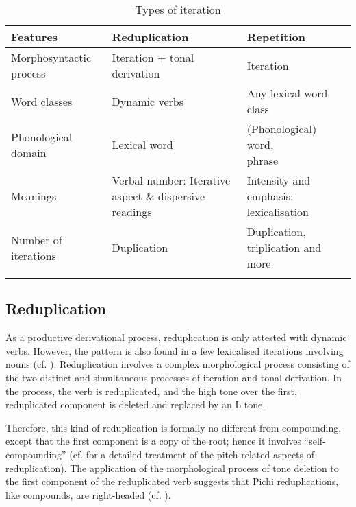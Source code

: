 \begin{table}
\caption{Types of iteration}
\label{tab:key:4.6}
\small
\begin{tabularx}{\textwidth}{lQp{3.5cm}}
\lsptoprule

Features & Reduplication & Repetition\\
\midrule
Morphosyntactic process & Iteration + tonal derivation & Iteration\\
\tablevspace
Word classes & Dynamic verbs & Any lexical word class\\
\tablevspace
Phonological domain & Lexical word & {(Phonological) word,\newline phrase}\\
\tablevspace
Meanings & Verbal number: Iterative aspect \& dispersive readings & Intensity and emphasis; lexicalisation\\
\tablevspace
Number of iterations & Duplication & Duplication, triplication and more\\
\lspbottomrule
\end{tabularx}
\end{table}
\subsection{Reduplication}\label{sec:4.5.1}

As a productive derivational process, reduplication is only attested with dynamic verbs. However, the pattern is also found in a few lexicalised iterations involving nouns (cf. ). Reduplication involves a complex morphological process consisting of the two distinct and simultaneous processes of iteration and tonal derivation. In the process, the verb is reduplicated, and the high tone over the first, reduplicated component is deleted and replaced by an L tone.


Therefore, this kind of reduplication is formally no different from compounding, except that the first component is a copy of the root; hence it involves “self-compounding” \citep[6]{Downing2001} (cf.  for a detailed treatment of the pitch-related aspects of reduplication). The application of the morphological process of tone deletion to the first component of the reduplicated verb suggests that Pichi reduplications, like compounds, are right-headed (cf. \citealt[117]{Odden1996}).



